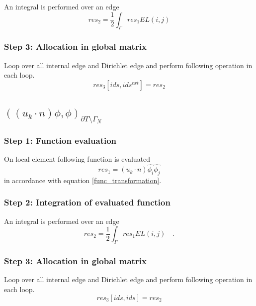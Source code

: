 \documentclass[a4paper]{book}
\begin{document}
An integral is performed over an edge 
\begin{equation}
res_2 = \frac{1}{2} \int_{\Gamma} res_1 EL(i,j)
\end{equation}

\subsubsection{Step 3: Allocation in global matrix}

Loop over all internal edge and Dirichlet edge and perform following operation in each loop.
\begin{equation}
res_3[ids,ids^{ext}] = res_2
\end{equation}

\subsection{$((u_k \cdot n)\phi,\phi)_{\partial T \setminus \Gamma_N}$}

\subsubsection{Step 1: Function evaluation}

On local element following function is evaluated 
\begin{equation}
res_1 = (u_k \cdot n) \hat{\phi_i} \hat{\phi_j}
\end{equation} 
in accordance with equation \ref{func_transformation}.\\

\subsubsection{Step 2: Integration of evaluated function}

An integral is performed over an edge
\begin{equation}
res_2 = \frac{1}{2} \int_{\Gamma} res_1 EL(i,j)  \quad \textrm{.}
\end{equation}

\subsubsection{Step 3: Allocation in global matrix}

Loop over all internal edge and Dirichlet edge and perform following operation in each loop.
\begin{equation}
res_3[ids,ids] = res_2
\end{equation}
\end{document}
